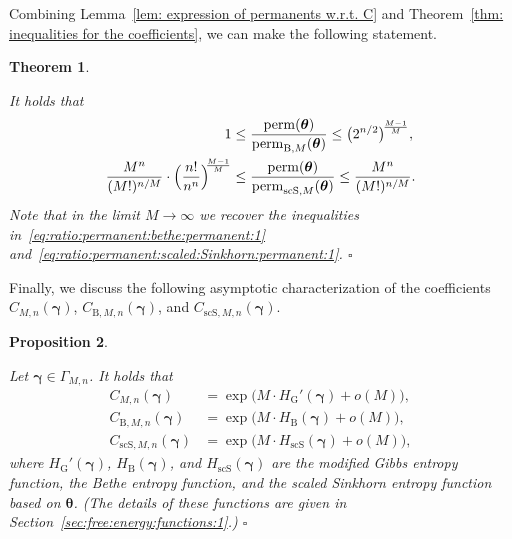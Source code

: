 \documentclass[journal,lettersize,twocolumn]{IEEEtran} %
\newtheorem{theorem}{Theorem}\setcounter{theorem}{0}
\newtheorem{proposition}[theorem]{Proposition}
\newcommand{\eproposition}{\hfill$\square$}
\newcommand{\etheorem}{\hfill$\square$}
\newcommand{\vect}[1]{ \bm{#1} }
\newcommand{\vgam}{ \vect{\gamma} }
\newcommand{\matr}[1]{ \bm{#1} }
\newcommand{\perm}{ \mathrm{perm} }
\newcommand{\permbM}[1]{\perm_{ \mathrm{B}, #1 }}
\newcommand{\permscsM}[1]{ \mathrm{perm}_{\mathrm{scS},#1} }
\newcommand{\CM}[1]{\Cgen{M}{#1}}
\newcommand{\Cgen}[2]{C_{#1,#2}}
\newcommand{\CBM}[1]{\CBgen{M}{#1}}
\newcommand{\CBgen}[2]{C_{\mathrm{B},#1,#2}}
\newcommand{\CscSgen}[2]{C_{\mathrm{scS},#1,#2}}
\newcommand{\mtheta}{\matr{\theta}}
\newcommand{\HBthe}{H_{ \mathrm{B} }}
\newcommand{\HscSthe}{H_{ \mathrm{scS} }}
\newcommand{\HG}{H_{ \mathrm{G} }}
\newcommand{\GamMn}{ \Gamma_{M,n} }
\begin{document}
%

Combining Lemma~\ref{lem: expression of permanents w.r.t. C} and
Theorem~\ref{thm: inequalities for the coefficients}, we can make the
following statement.

%

\begin{theorem}
  \label{th:main:permanent:inequalities:1}

  It holds that
  \begin{align}
    1 
      &\leq
         \frac{\perm(\mtheta)}{\permbM{M}(\mtheta)}
       \leq
         \bigl( 2^{n/2} \bigr)^{\! \frac{M-1}{M}}
           \label{sec:1:eqn:147}, \\
    \frac{M^{n}}{(M!)^{n/M}}
    \cdot
    \Bigl( \frac{n!}{n^{n}} \Bigr)^{\!\! \frac{M-1}{M}}
      &\leq
         \frac{ \perm(\mtheta) }{ \permscsM{M}(\mtheta) }
       \leq
         \frac{M^{n}}{(M!)^{n/M}}.
           \label{sec:1:eqn:200}
  \end{align}
  Note that in the limit $M \to \infty$ we recover the inequalities
  in~\eqref{eq:ratio:permanent:bethe:permanent:1}
  and~\eqref{eq:ratio:permanent:scaled:Sinkhorn:permanent:1}.
  \etheorem
\end{theorem}

%

Finally, we discuss the following asymptotic characterization of the
coefficients $\CM{n}( \vgam )$, $\CBM{n}( \vgam )$, and
$\CscSgen{M}{n}( \vgam )$.

%

\begin{proposition}
  \label{prop:coefficient:asymptotitic:characterization:1}
  
  Let $\vgam \in \GamMn$. It holds that
  \begin{align}
    \CM{n}( \vgam )
      &= \exp\bigl( M \cdot \HG'(\vgam) + o(M) \bigr),
           \label{sec:1:eqn:125} \\
    \CBM{n}( \vgam )
      &= \exp\bigl( M \cdot \HBthe(\vgam) + o(M) \bigr),
           \label{sec:1:eqn:206}  \\
    \CscSgen{M}{n}( \vgam )
      &= \exp\bigl( M \cdot \HscSthe(\vgam) + o(M) \bigr),
           \label{sec:1:eqn:207}
  \end{align}
  where $\HG'(\vgam)$, $\HBthe(\vgam)$, and $\HscSthe(\vgam)$ are the
  modified Gibbs entropy function, the Bethe entropy function, and the
  scaled Sinkhorn entropy function based on $\mtheta$. (The details of these
  functions are given in Section~\ref{sec:free:energy:functions:1}.)
  \eproposition
\end{proposition}
\end{document}
